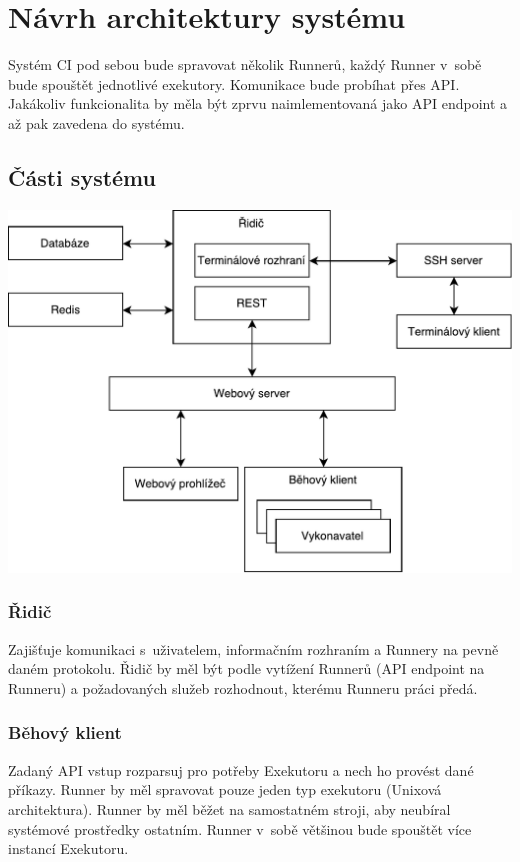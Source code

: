 \chapter{Návrh architektury systému}

Systém CI pod sebou bude spravovat několik Runnerů, každý Runner v~sobě bude spouštět jednotlivé exekutory.
Komunikace bude probíhat přes API.
Jakákoliv funkcionalita by měla být zprvu naimlementovaná jako API endpoint a až pak zavedena do systému.

\section{Části systému}

\includegraphics[max width=\linewidth]{graphs/architektura_piper.pdf}

\subsection{Řidič}

Zajišťuje komunikaci s~uživatelem, informačním rozhraním a Runnery na pevně daném protokolu.
Řidič by měl být podle vytížení Runnerů (API endpoint na Runneru) a požadovaných služeb rozhodnout, kterému Runneru práci předá.

\subsection{Běhový klient}

Zadaný API vstup rozparsuj pro potřeby Exekutoru a nech ho provést dané příkazy.
Runner by měl spravovat pouze jeden typ exekutoru (Unixová architektura).
Runner by měl běžet na samostatném stroji, aby neubíral systémové prostředky ostatním.
Runner v~sobě většinou bude spouštět více instancí Exekutoru.

